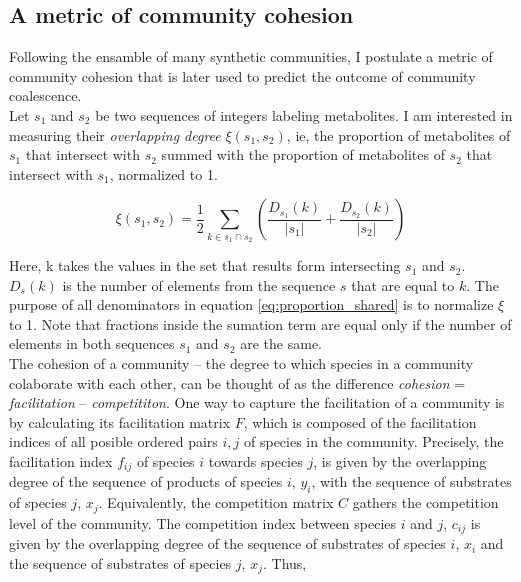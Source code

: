 \documentclass[titlepage,11pt]{article}
\begin{document}
\begin{linenumbers}
			\subsection{A metric of community cohesion}
			Following the ensamble of many synthetic communities, I postulate a metric of community cohesion that is later used to predict the outcome of community coalescence.\\
			Let $ s_1 $ and $ s_2 $ be two sequences of integers labeling metabolites. I am interested in measuring  their \textit{overlapping degree} $ \xi(s_1, s_2) $, ie, the proportion of metabolites of $ s_1 $ that intersect with $ s_2 $ summed with the proportion of metabolites of $ s_2 $ that intersect with $ s_1 $, normalized to 1.
			\begin{linenomath*}	
			\begin{equation}\label{eq:proportion_shared}
				\xi (s_1, s_2) = \frac {1}{2} \sum_{k \in s_1 \cap s_2} \left(\frac{D_{s_1}(k)}{|s_1|} + \frac{D_{s_2}(k)}{|s_2|}\right)
			\end{equation}
			\end{linenomath*}	
			Here, k takes the values in the set that results form intersecting $ s_1 $ and $ s_2 $. $ D_s(k) $ is the number of elements from the sequence $ s $ that are equal to $ k $. The purpose of all denominators in equation \ref{eq:proportion_shared} is to normalize $ \xi $ to 1. Note that fractions inside the sumation term are equal only if the number of elements in both sequences $ s_1 $ and $ s_2 $ are the same.\\
			The cohesion of a community -- the degree to which species in a community colaborate with each other, can be thought of as the difference \textit{cohesion} = \textit{facilitation} -- \textit{competititon}. One way to capture the facilitation of a community is by calculating its facilitation matrix $ F $, which is composed of the facilitation indices of all posible ordered pairs $ i, j $ of species in the community. Precisely, the facilitation index $ f_{ij} $ of species $ i $ towards species $ j $, is given by the overlapping degree of the sequence of products of species $ i $,  $ y_i $, with the sequence of substrates of species $ j $, $ x_j $. Equivalently, the competition matrix $ C $ gathers the competition level of the community. The competition index between species $ i $ and $ j $,  $ c_{ij} $  is given by the overlapping degree of the sequence of substrates of species $ i $, $ x_i $ and the sequence of substrates of species $ j $, $ x_j $. Thus, 
			\begin{linenomath*}	

\end{linenomath*}
\end{linenumbers}
\end{document}

